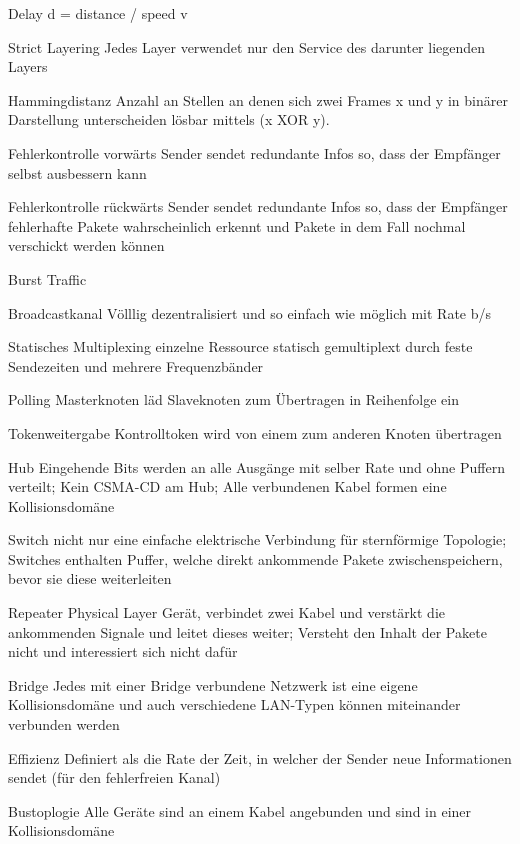 \documentclass[10pt,landscape]{article}
\begin{document}
\begin{multicols}{3}
\begin{description*}
        \item[Delay d] = distance / speed v
        \item[Strict Layering] Jedes Layer verwendet nur den Service des darunter liegenden Layers
        \item[Hammingdistanz] Anzahl an Stellen an denen sich zwei Frames x und y in binärer Darstellung unterscheiden lösbar mittels (x XOR y).
        \item[Fehlerkontrolle vorwärts] Sender sendet redundante Infos so, dass der Empfänger selbst ausbessern kann
        \item[Fehlerkontrolle rückwärts] Sender sendet redundante Infos so, dass der Empfänger fehlerhafte Pakete wahrscheinlich erkennt und Pakete in dem Fall nochmal verschickt werden können
        \item[Burst Traffic]
        \item[Broadcastkanal] Völllig dezentralisiert und so einfach wie möglich mit Rate b/s
        \item[Statisches Multiplexing] einzelne Ressource statisch gemultiplext durch feste Sendezeiten und mehrere Frequenzbänder
        \item[Polling] Masterknoten läd Slaveknoten zum Übertragen in Reihenfolge ein
        \item[Tokenweitergabe] Kontrolltoken wird von einem zum anderen Knoten übertragen
        \item[Hub] Eingehende Bits werden an alle Ausgänge mit selber Rate und ohne Puffern verteilt; Kein CSMA-CD am Hub; Alle verbundenen Kabel formen eine Kollisionsdomäne
        \item[Switch] nicht nur eine einfache elektrische Verbindung für sternförmige Topologie; Switches enthalten Puffer, welche direkt ankommende Pakete zwischenspeichern, bevor sie diese weiterleiten
        \item[Repeater] Physical Layer Gerät, verbindet zwei Kabel und verstärkt die ankommenden Signale und leitet dieses weiter; Versteht den Inhalt der Pakete nicht und interessiert sich nicht dafür
        \item[Bridge] Jedes mit einer Bridge verbundene Netzwerk ist eine eigene Kollisionsdomäne und auch verschiedene LAN-Typen können miteinander verbunden werden
        \item[Effizienz] Definiert als die Rate der Zeit, in welcher der Sender neue Informationen sendet (für den fehlerfreien Kanal)
        \item[Bustoplogie] Alle Geräte sind an einem Kabel angebunden und sind in einer Kollisionsdomäne

\end{description*}
\end{multicols}
\end{document}
